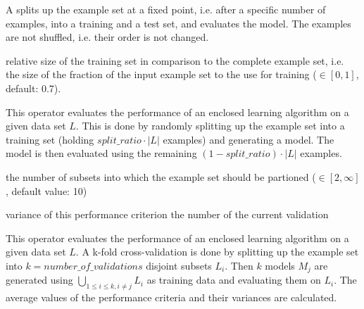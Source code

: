 \begin{values}
\validationchainvalues
\end{values}

\opdescr A  splits up the example set at a
fixed point, i.e. after a specific number of examples, into a training
and a test set, and evaluates the model. The examples are not shuffled, 
i.e. their order is not changed.





\validationchaindata

\begin{parameters}
 relative size of the training set in comparison to the complete example set, 
i.e. the size of the fraction of the input example set to the use for training ($\in [0,1]$, default: 0.7).
\end{parameters}

\begin{values}
\validationchainvalues
\end{values}

\opdescr This operator evaluates the performance of an enclosed learning algorithm on a given data set $L$. 
This is done by randomly splitting up the example set into a training set (holding $split\_ratio \cdot |L|$ examples) 
and generating a model. The model is then evaluated using the remaining $(1-split\_ratio) \cdot |L|$ examples.




\validationchaindata

\begin{parameters}
 the number of subsets into which
the example set should be partioned ($\in [2,\infty]$, default value: 10)
\end{parameters}

\begin{values}
\validationchainvalues
\val[variance] variance of this performance criterion
\val[validation] the number of the current validation
\end{values}

\opdescr This operator evaluates the performance of an enclosed
learning algorithm on a given data set $L$. A k-fold cross-validation
is done by splitting up the example set into $k=number\_of\_validations$ disjoint subsets $L_{i}$. 
Then $k$ models $M_{j}$ are generated using
$\bigcup_{1\le i \le k,i\neq j}L_{i}$ as training data and evaluating
them on $L_{i}$. The average values of the performance criteria and their variances are calculated.



